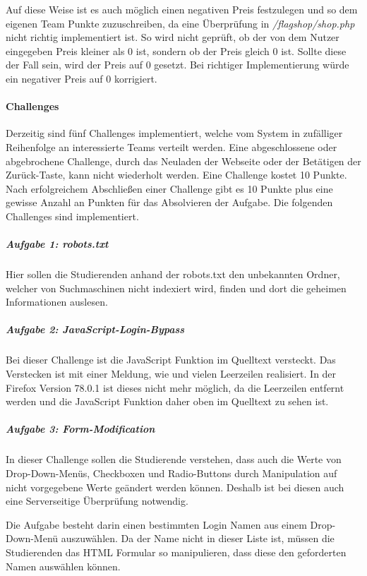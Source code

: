 Auf diese Weise ist es auch möglich einen negativen Preis festzulegen und so dem eigenen Team Punkte zuzuschreiben, da eine Überprüfung in \textit{/flagshop/shop.php} nicht richtig implementiert ist. So wird nicht geprüft, ob der von dem Nutzer eingegeben Preis kleiner als 0 ist, sondern ob der Preis gleich 0 ist. Sollte diese der Fall sein, wird der Preis auf 0 gesetzt. Bei richtiger Implementierung würde ein negativer Preis auf 0 korrigiert.

\paragraph{Challenges} \label{para:Challenges}
Derzeitig sind fünf Challenges implementiert, welche vom System in zufälliger Reihenfolge an interessierte Teams verteilt werden. Eine abgeschlossene oder abgebrochene Challenge, durch das Neuladen der Webseite oder der Betätigen der Zurück-Taste, kann nicht wiederholt werden. Eine Challenge kostet 10 Punkte. Nach erfolgreichem Abschließen einer Challenge gibt es 10 Punkte plus eine gewisse Anzahl an Punkten für das Absolvieren der Aufgabe. Die folgenden Challenges sind implementiert\cite[S.19-20]{abtsUeberarbeitungUndErweiterung2016}.

\subparagraph{Aufgabe 1: robots.txt}\label{subpara:Aufgabe_1_robots.txt}
Hier sollen die Studierenden anhand der robots.txt den unbekannten Ordner, welcher von Suchmaschinen nicht indexiert wird, finden und dort die geheimen Informationen auslesen.

\subparagraph{Aufgabe 2: JavaScript-Login-Bypass}\label{subpara:Aufgabe_2_JavaScript-Login-Bypass}
Bei dieser Challenge ist die JavaScript Funktion im Quelltext versteckt. Das Verstecken ist mit einer Meldung, wie  und vielen Leerzeilen realisiert. In der Firefox Version 78.0.1 ist dieses nicht mehr möglich, da die Leerzeilen entfernt werden und die JavaScript Funktion daher oben im Quelltext zu sehen ist.

\subparagraph{Aufgabe 3: Form-Modification}\label{subpara:Aufgabe_3_Form-Modification}
In dieser Challenge sollen die Studierende verstehen, dass auch die Werte von Drop-Down-Menüs, Checkboxen und Radio-Buttons durch Manipulation auf nicht vorgegebene Werte geändert werden können. Deshalb ist bei diesen auch eine Serverseitige Überprüfung notwendig.

Die Aufgabe besteht darin einen bestimmten Login Namen aus einem Drop-Down-Menü auszuwählen. Da der Name nicht in dieser Liste ist, müssen die Studierenden das HTML Formular so manipulieren, dass diese den geforderten Namen auswählen können.

